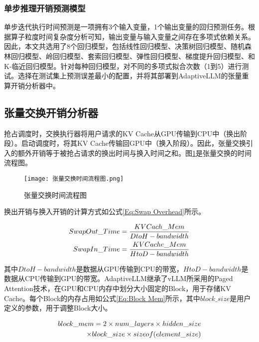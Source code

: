 \subsubsection{单步推理开销预测模型}

单步迭代执行时间预测是一项拥有3个输入变量，1个输出变量的回归预测任务。根据算子粒度时间复杂度分析可知，输出变量与输入变量之间存在多项式依赖关系。因此，本文共选用了8个回归模型，包括线性回归模型、决策树回归模型、随机森林回归模型、岭回归模型、套索回归模型、弹性回归模型、梯度提升回归模型、和K-临近回归模型。针对每种回归模型，对不同的多项式拟合次数（1到5）进行测试。选择在测试集上预测误差最小的配置，并将其部署到AdaptiveLLM的张量重算开销分析器中。 

\subsection{张量交换开销分析器}

抢占调度时，交换执行器将用户请求的KV Cache从GPU传输到CPU中（换出阶段）。启动调度时，将其KV Cache传输回GPU中（换入阶段）。因此，张量交换引入的额外开销等于被抢占请求的换出时间与换入时间之和。图\ref{Fig:张量交换时间流程图}是张量交换的时间流程图。

\begin{figure}[!htbp]
  \centering
  \texttt{[image: 张量交换时间流程图.png]}
  \caption{张量交换时间流程图}
  \label{Fig:张量交换时间流程图}
\end{figure}

换出开销与换入开销的计算方式如公式\ref{Eq:Swap Overhead}所示。

\begin{equation}
  \begin{aligned}
    SwapOut\_Time=\frac{KVCach\_Mem}{DtoH-bandwidth} \\
    SwapIn\_Time=\frac{KVCache\_Mem}{HtoD-bandwidth}
  \end{aligned}
  \label{Eq:Swap Overhead}
  \setlength{\abovedisplayskip}{0ex}
  \setlength{\belowdisplayskip}{2ex}
\end{equation}

其中$DtoH-bandwidth$是数据从GPU传输到CPU的带宽，$HtoD-bandwidth$是数据从CPU传输到GPU的带宽。AdaptiveLLM继承了vLLM所采用的Paged Attention技术，在GPU和CPU内存中划分大小固定的Block，用于存储KV Cache。每个Block的内存占用如公式\ref{Eq:Block Mem}所示，其中$block\_size$是用户定义的参数，用于调整Block大小。

\begin{equation}
  \begin{aligned}
    block\_mem = 2 \times num\_layers \times hidden\_size \\ 
    \times block\_size \times sizeof(element\_size)
  \end{aligned}
  \label{Eq:Block Mem}
  \setlength{\abovedisplayskip}{0ex}
  \setlength{\belowdisplayskip}{2ex}
\end{equation}

